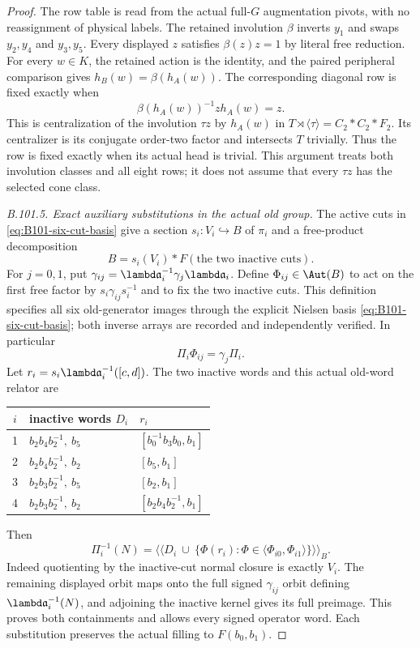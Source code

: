 \begin{proof}
The row table is read from the actual full-$G$ augmentation pivots,
with no reassignment of physical labels.
The retained involution $\beta$ inverts $y_1$ and swaps
$y_2,y_4$ and $y_3,y_5$.
Every displayed $z$ satisfies $\beta(z)z=1$ by literal free reduction.
For every $w\in K$, the retained action is the identity, and the
paired peripheral comparison gives $h_B(w)=\beta(h_A(w))$.
The corresponding diagonal row is fixed exactly when
\[
 \beta(h_A(w))^{-1}z h_A(w)=z.
\]
This is centralization of the involution $\tau z$ by $h_A(w)$ in
$T\rtimes\langle\tau\rangle=C_2*C_2*F_2$.
Its centralizer is its conjugate order-two factor and intersects
$T$ trivially.  Thus the row is fixed exactly when its actual head
is trivial.  This argument treats both involution classes and all
eight rows; it does not assume that every $\tau z$ has the selected
cone class.

\emph{B.101.5. Exact auxiliary substitutions in the actual old group.}
The active cuts in \eqref{eq:B101-six-cut-basis} give a section
$s_i:V_i\hookrightarrow B$ of $\pi_i$ and a free-product decomposition
\[
 B=s_i(V_i)*F(\text{the two inactive cuts}).
\]
For $j=0,1$, put
$\gamma_{ij}=\lambd\mathfrak{a}_i^{-1}\gamma_j\lambd\mathfrak{a}_i$.
Define $\Phi_{ij}\in\Aut(B)$ to act on the first free factor by
$s_i\gamma_{ij}s_i^{-1}$ and to fix the two inactive cuts.
This definition specifies all six old-generator images through the
explicit Nielsen basis \eqref{eq:B101-six-cut-basis}; both inverse
arrays are recorded and independently verified.
In particular
\begin{equation}\label{eq:B101-substitution-diagram}
 \Pi_i\Phi_{ij}=\gamma_j\Pi_i.
\end{equation}
Let $r_i=s_i\lambd\mathfrak{a}_i^{-1}([c,d])$.
The two inactive words and this actual old-word relator are
\begin{center}
\begin{tabular}{c@{\quad}ll}
\toprule
$i$&inactive words $D_i$&$r_i$\\
\midrule
1&$b_2b_4b_2^{-1},\ b_5$&$[b_0^{-1}b_3b_0,b_1]$\\
2&$b_2b_4b_2^{-1},\ b_2$&$[b_5,b_1]$\\
3&$b_2b_3b_2^{-1},\ b_5$&$[b_2,b_1]$\\
4&$b_2b_3b_2^{-1},\ b_2$&$[b_2b_4b_2^{-1},b_1]$\\
\bottomrule
\end{tabular}
\end{center}
Then
\begin{equation}\label{eq:B101-substitution-kernel}
 \Pi_i^{-1}(N)=
 \big\langle\!\big\langle
 D_i\ \cup\ \{\Phi(r_i):\Phi\in
                    \langle\Phi_{i0},\Phi_{i1}\rangle\}
 \big\rangle\!\big\rangle_B.
\end{equation}
Indeed quotienting by the inactive-cut normal closure is exactly
$V_i$.  The remaining displayed orbit maps onto the full signed
$\gamma_{ij}$ orbit defining $\lambd\mathfrak{a}_i^{-1}(N)$, and adjoining
the inactive kernel gives its full preimage.  This proves both
containments and allows every signed operator word.
Each substitution preserves the actual filling to $F(b_0,b_1)$.


\end{proof}
